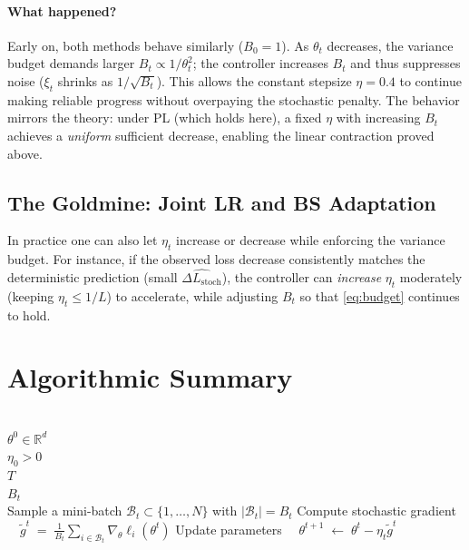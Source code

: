 \documentclass[12pt]{article}
\begin{document}
\paragraph{What happened?} Early on, both methods behave similarly ($B_0=1$). As $\theta_t$ decreases, the variance budget demands larger $B_t\!\propto\! 1/\theta_t^2$; the controller increases $B_t$ and thus suppresses noise ($\xi_t$ shrinks as $1/\sqrt{B_t}$). This allows the constant stepsize $\eta=0.4$ to continue making reliable progress without overpaying the stochastic penalty. The behavior mirrors the theory: under PL (which holds here), a fixed $\eta$ with increasing $B_t$ achieves a \emph{uniform} sufficient decrease, enabling the linear contraction proved above.

\subsection{The Goldmine: Joint LR and BS Adaptation}
In practice one can also let $\eta_t$ increase or decrease while enforcing the variance budget. For instance, if the observed loss decrease consistently matches the deterministic prediction (small $\widehat{\Delta L_{\mathrm{stoch}}}$), the controller can \emph{increase} $\eta_t$ moderately (keeping $\eta_t\le 1/L$) to accelerate, while adjusting $B_t$ so that \eqref{eq:budget} continues to hold.





\section{Algorithmic Summary}
\begin{algorithm}[H]
\caption{Standard Stochastic Gradient Descent (SGD)}
\label{alg:SGD}
\begin{algorithmic}[1]
  \Require
    \\
    \(\theta^0 \in \mathbb{R}^d\)  \\
    \(\eta_0 > 0\)  \\
    \(T\)  \\
    \(B_t\)  \\

    \State Sample a mini-batch \(\mathcal{B}_t \subset \{1,\dots,N\}\) with \(|\mathcal{B}_t| = B_t\)  
    \State Compute stochastic gradient $\quad \tilde g^t \;=\; \frac{1}{B_t}\sum_{i \in \mathcal{B}_t} \nabla_\theta \ell_i(\theta^t)$
    \State Update parameters $\quad \theta^{t+1} \;\gets\; \theta^t - \eta_t \tilde g^t$
  \EndFor  

\end{algorithmic}
\end{algorithm}
\end{document}
